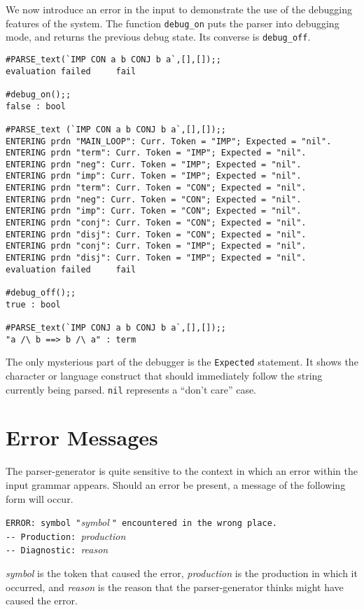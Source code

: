 We now introduce an error in the input to 
demonstrate the use of the
debugging features of the system.  
The function \verb"debug_on"
puts the parser into debugging mode, and returns the previous debug state.
Its converse is \verb"debug_off".
\small
\begin{center}
\begin{session}
\begin{verbatim}
#PARSE_text(`IMP CON a b CONJ b a`,[],[]);;
evaluation failed     fail

#debug_on();;
false : bool

#PARSE_text (`IMP CON a b CONJ b a`,[],[]);;
ENTERING prdn "MAIN_LOOP": Curr. Token = "IMP"; Expected = "nil".
ENTERING prdn "term": Curr. Token = "IMP"; Expected = "nil".
ENTERING prdn "neg": Curr. Token = "IMP"; Expected = "nil".
ENTERING prdn "imp": Curr. Token = "IMP"; Expected = "nil".
ENTERING prdn "term": Curr. Token = "CON"; Expected = "nil".
ENTERING prdn "neg": Curr. Token = "CON"; Expected = "nil".
ENTERING prdn "imp": Curr. Token = "CON"; Expected = "nil".
ENTERING prdn "conj": Curr. Token = "CON"; Expected = "nil".
ENTERING prdn "disj": Curr. Token = "CON"; Expected = "nil".
ENTERING prdn "conj": Curr. Token = "IMP"; Expected = "nil".
ENTERING prdn "disj": Curr. Token = "IMP"; Expected = "nil".
evaluation failed     fail

#debug_off();;
true : bool

#PARSE_text(`IMP CONJ a b CONJ b a`,[],[]);;
"a /\ b ==> b /\ a" : term
\end{verbatim}
\end{session}
\end{center}
\normalsize
The only mysterious part of the debugger is the \verb"Expected" statement.
It shows the character or language construct that should immediately follow 
the string currently being parsed.  \verb"nil" represents a ``don't care''
case.

\section{Error Messages}

The parser-generator is quite sensitive to the context in which an 
error
within the input grammar appears.  Should an error be present, a message of the
following form will occur.
\begin{center}
\begin{boxed}
\verb+ERROR: symbol "+{\it symbol}$\;$\verb+" encountered in the wrong place.+ \\
\hspace*{4ex}\verb+-- Production: +{\it production} \\
\hspace*{4ex}\verb+-- Diagnostic: +{\it reason}
\end{boxed}
\end{center}
{\it symbol} is the token that caused the error, {\it production} is the
production in which it occurred, and {\it reason} is the reason that the
parser-generator thinks might have caused the error.

